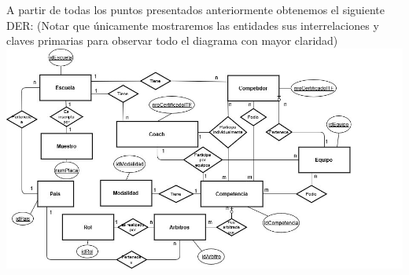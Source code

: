 A partir de todas los puntos presentados anteriormente obtenemos el siguiente DER: (Notar que únicamente mostraremos las entidades sus interrelaciones y claves primarias para observar todo el diagrama con mayor claridad)\\

\includegraphics[scale=0.55]{der.jpg}